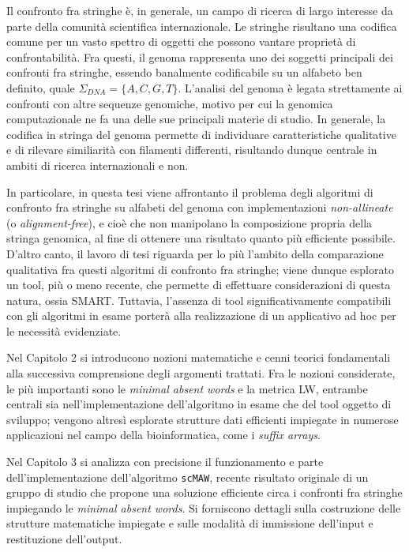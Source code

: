 Il confronto fra stringhe è, in generale, un campo di ricerca di largo interesse da parte della comunità scientifica internazionale. Le stringhe risultano una codifica comune per un vasto spettro di oggetti che possono vantare proprietà di confrontabilità. Fra questi, il genoma rappresenta uno dei soggetti  principali dei confronti fra stringhe, essendo banalmente codificabile su un alfabeto ben definito, quale $\Sigma_{DNA}=\{ A,C,G,T \}$. L'analisi del genoma è legata strettamente ai confronti con altre sequenze genomiche, motivo per cui la genomica computazionale ne fa una delle sue principali materie di studio. In generale, la codifica in stringa del genoma permette di individuare caratteristiche qualitative e di rilevare similiarità con filamenti differenti, risultando dunque centrale in ambiti di ricerca internazionali e non.

\vspace{3mm}

In particolare, in questa tesi viene affrontanto il problema degli algoritmi di confronto fra stringhe su alfabeti del genoma con implementazioni \textit{non-allineate} (o \textit{alignment-free}), e cioè che non manipolano la composizione propria della stringa genomica, al fine di ottenere una risultato quanto più efficiente possibile. D'altro canto, il lavoro di tesi riguarda per lo più l'ambito della comparazione qualitativa fra questi algoritmi di confronto fra stringhe; viene dunque esplorato un tool, più o meno recente, che permette di effettuare considerazioni di questa natura, ossia SMART. Tuttavia, l'assenza di tool significativamente compatibili con gli algoritmi in esame porterà alla realizzazione di un applicativo ad hoc per le necessità evidenziate. 

\vspace{3mm}

Nel Capitolo 2 si introducono nozioni matematiche e cenni teorici fondamentali alla successiva comprensione degli argomenti trattati. Fra le nozioni considerate, le più importanti sono le \textit{minimal absent words} e la metrica LW, entrambe centrali sia nell'implementazione dell'algoritmo in esame che del tool oggetto di sviluppo; vengono altresì esplorate strutture dati efficienti impiegate in numerose applicazioni nel campo della bioinformatica, come i \textit{suffix arrays}.

Nel Capitolo 3 si analizza con precisione il funzionamento e parte dell'implementazione dell'algoritmo \verb|scMAW|, recente risultato originale di un gruppo di studio che propone una soluzione efficiente circa i confronti fra stringhe impiegando le \textit{minimal absent words}. Si forniscono dettagli sulla costruzione delle strutture matematiche impiegate e sulle modalità di immissione dell'input e restituzione dell'output.

